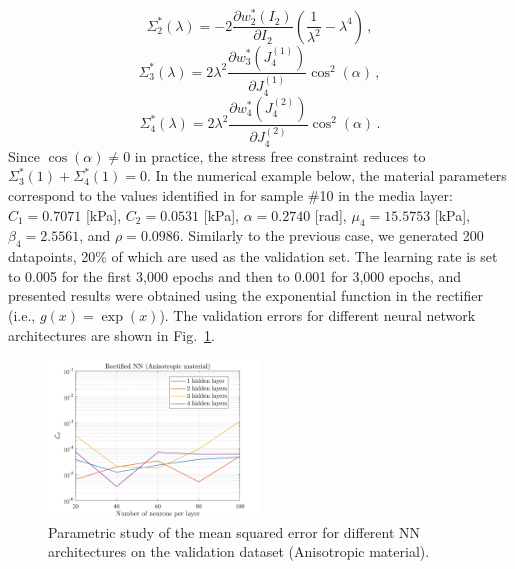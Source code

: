\begin{equation}
    \Sigma^*_2(\lambda) = -2 \frac{\partial w_2^*(I_2)}{\partial I_2} \left(\frac{1}{\lambda^2} - \lambda^4 \right)\,,
\end{equation}
\begin{equation}
    \Sigma_3^*(\lambda) = 2 \lambda^2 \frac{\partial w_3^*(J_4^{(1)})}{\partial J_4^{(1)}} \cos^2(\alpha)\,,
\end{equation}
\begin{equation}\label{eq:aniso-last-stress-component}
    \Sigma_4^*(\lambda) = 2 \lambda^2 \frac{\partial w_4^*(J_4^{(2)})}{\partial J_4^{(2)}} \cos^2(\alpha)\,.
\end{equation}
Since $\cos(\alpha) \neq 0$ in practice, the stress free constraint reduces to $\Sigma^*_3(1) + \Sigma^*_4(1) = 0$.
In the numerical example below, the material parameters correspond to the values identified in \cite{CHEN2022114897} for sample \#10 in the media layer: $C_1 = 0.7071$ [kPa], $C_2 = 0.0531$ [kPa], $\alpha = 0.2740$ [rad], $\mu_4 = 15.5753$ [kPa], $\beta_4 = 2.5561$, and $\rho = 0.0986$. Similarly to the previous case, we generated 200 datapoints, 20\% of which are used as the validation set. The learning rate is set to 0.005 for the first 3,000 epochs and then to 0.001 for 3,000 epochs, and presented results were obtained using the exponential function in the rectifier (i.e., $g(x) = \exp(x)$). The validation errors for different neural network architectures are shown in Fig.~\ref{fig:ani_err}.
\begin{figure}[ht!]
    \begin{center}
    \includegraphics[width=0.5\textwidth]{Pictures/ANI_ERR.png}
    \end{center}
    \caption[Parametric study for RNN architectures.]{Parametric study of the mean squared error for different NN architectures on the validation dataset (Anisotropic material).}
    \label{fig:ani_err}
\end{figure}
